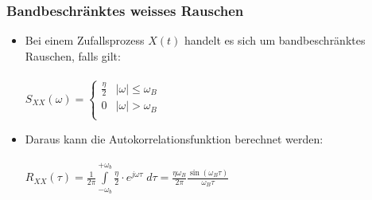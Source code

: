 \documentclass[10pt, a4paper]{article}
\begin{document}
\subsubsection{Bandbeschr\"anktes weisses Rauschen}
\begin{itemize}
  \item Bei einem Zufallsprozess $X(t)$ handelt es sich 
        um bandbeschr\"anktes Rauschen, falls gilt: \\ \\
        $S_{XX}(\omega) = \left\lbrace \begin{array}{ll}
                            \frac{\eta}{2} & \mid\!\omega\!\mid \leq \omega_{B} \\
                            0              & \mid\!\omega\!\mid > \omega_{B} \\
                          \end{array} \right. $ \\ 
  \item Daraus kann die Autokorrelationsfunktion berechnet werden: \\ \\
        $R_{XX}(\tau) =  \frac{1}{2\pi} \int\limits_{-\omega_{b}}^{+\omega_{b}}
                                           \frac{\eta}{2}  \cdot e^{j\omega\tau}\; d\tau
                      = \frac{\eta\omega_{B}}{2\pi} \frac{\sin(\omega_{B}\tau)}{\omega_{B}\tau}$ 
\end{itemize} 

\clearpage
\end{document}
